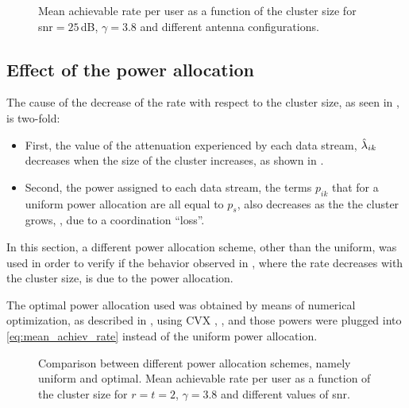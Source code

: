 \begin{figure}[t]
\begin{center}
    \hspace*{0.5mm}
\end{center}
\caption{Mean achievable rate per user as a function of the cluster size for
\gls{snr}$=25\,$dB, $\gamma=3.8$ and different antenna configurations.}
\label{fig:rate_vs_size_antenna}
\end{figure}

\subsection{Effect of the power allocation}\label{ssec:achiev_power_allocation}

The cause of the decrease of the rate with respect to the cluster size, as seen
in , is two-fold:

\begin{itemize}
    \item First, the value of the attenuation experienced by each data stream,
        $\hat{\lambda}_{ik}$ decreases when the size of the cluster increases, as
        shown in .
    \item Second, the power assigned to each data stream, the terms $p_{ik}$
        that for a uniform power allocation are all equal to $p_s$, also
        decreases as the the cluster grows, , due to a
        coordination ``loss''.
\end{itemize}

In this section, a different power allocation scheme, other than the uniform,
was used in order to verify if the behavior observed in
, where the rate decreases with the cluster size,
is due to the power allocation.

The optimal power allocation used was obtained by means of numerical
optimization, as described in \cite{armada11b}, using CVX \cite{cvx},
\cite{gb08}, and those powers were plugged into \eqref{eq:mean_achiev_rate}
instead of the uniform power allocation.

\begin{figure}[t]
\begin{center}
    \hspace*{-1mm}
\end{center}
\caption{Comparison between different power allocation schemes, namely uniform
and optimal. Mean achievable rate per user as a function of the cluster size for
$r=t=2$, $\gamma=3.8$ and different values of \gls{snr}.}
\label{fig:rate_vs_size_power}
\end{figure}

